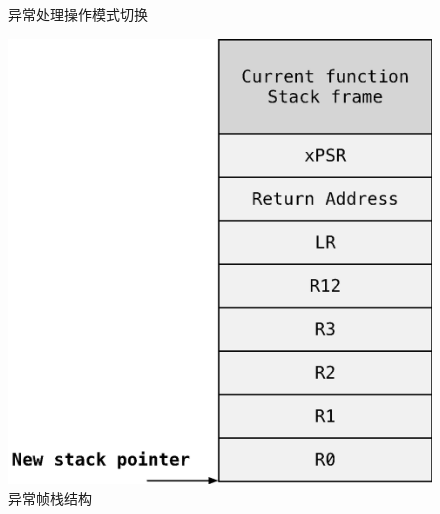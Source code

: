 \documentclass[12pt,a4paper]{ctexart}
\begin{document}
\begin{figure}[htbp]
\begin{minipage}[t]{0.4\textwidth}
        \caption{异常处理操作模式切换}
    \end{minipage}
    \hspace{0.58in} %
    \begin{minipage}[t]{0.4\textwidth}%
        \centering
        \includegraphics[scale=0.25]{graph/4.png}
        \caption{异常帧栈结构}
    \end{minipage}
\end{figure}
\end{document}

